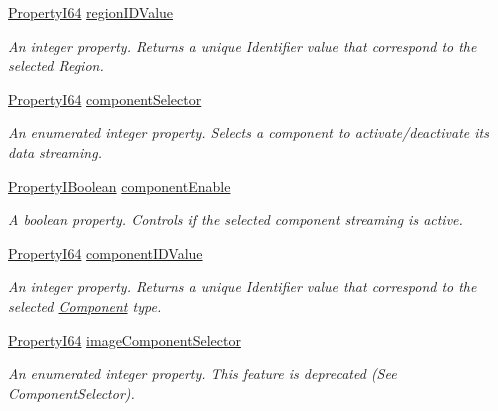 \begin{DoxyCompactItemize}
\hyperlink{group___common_interface_ga81749b2696755513663492664a18a893}{Property\+I64} \hyperlink{classmv_i_m_p_a_c_t_1_1acquire_1_1_gen_i_cam_1_1_image_format_control_a25e094bef27e094cac127f308dae8407}{region\+I\+D\+Value}
\begin{DoxyCompactList}\small\item\em An integer property. Returns a unique Identifier value that correspond to the selected Region. \end{DoxyCompactList}\item 
\hyperlink{group___common_interface_ga81749b2696755513663492664a18a893}{Property\+I64} \hyperlink{classmv_i_m_p_a_c_t_1_1acquire_1_1_gen_i_cam_1_1_image_format_control_a1096fd210e8ed296fc47a416688b8678}{component\+Selector}
\begin{DoxyCompactList}\small\item\em An enumerated integer property. Selects a component to activate/deactivate its data streaming. \end{DoxyCompactList}\item 
\hyperlink{group___common_interface_ga44f9437e24b21b6c93da9039ec6786aa}{Property\+I\+Boolean} \hyperlink{classmv_i_m_p_a_c_t_1_1acquire_1_1_gen_i_cam_1_1_image_format_control_a12e4c6659914f9a24825c2f4a0720cfe}{component\+Enable}
\begin{DoxyCompactList}\small\item\em A boolean property. Controls if the selected component streaming is active. \end{DoxyCompactList}\item 
\hyperlink{group___common_interface_ga81749b2696755513663492664a18a893}{Property\+I64} \hyperlink{classmv_i_m_p_a_c_t_1_1acquire_1_1_gen_i_cam_1_1_image_format_control_a99685f27c0089fe69239c14a503342c1}{component\+I\+D\+Value}
\begin{DoxyCompactList}\small\item\em An integer property. Returns a unique Identifier value that correspond to the selected \hyperlink{classmv_i_m_p_a_c_t_1_1acquire_1_1_component}{Component} type. \end{DoxyCompactList}\item 
\hyperlink{group___common_interface_ga81749b2696755513663492664a18a893}{Property\+I64} \hyperlink{classmv_i_m_p_a_c_t_1_1acquire_1_1_gen_i_cam_1_1_image_format_control_a9ca6d7404e0a91dffc11e1ac777f2d23}{image\+Component\+Selector}
\begin{DoxyCompactList}\small\item\em An enumerated integer property. This feature is deprecated (See Component\+Selector). \end{DoxyCompactList}\item 

\end{DoxyCompactItemize}
